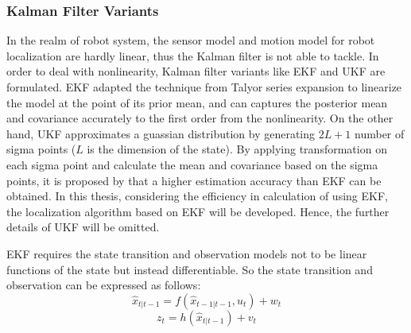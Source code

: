 \subsubsection{Kalman Filter Variants}
In the realm of robot system, the sensor model and motion model for robot localization are hardly linear, thus the Kalman filter is not able to tackle. In order to deal with nonlinearity, Kalman filter variants like \gls{EKF} and \gls{UKF} are formulated. \gls{EKF} adapted the technique from Talyor series expansion to linearize the model at the point of its prior mean, and can captures the posterior mean and covariance accurately to the first order from the nonlinearity. On the other hand, \gls{UKF} approximates a guassian distribution by generating $2L+1$ number of sigma points ($L$ is the dimension of the state). By applying transformation on each sigma point and calculate the mean and covariance based on the sigma points, it is proposed by \cite{Wan2000} that a higher estimation accuracy than \gls{EKF} can be obtained. In this thesis, considering the efficiency in calculation of using \gls{EKF}, the localization algorithm based on \gls{EKF} will be developed. Hence, the further details of \gls{UKF} will be omitted.

\gls{EKF} requires the state transition and observation models not to be linear functions of the state but instead differentiable. So the state transition and observation can be expressed as follows: 
\begin{equation}
\hat{x}_{t|t-1} = f(\hat{x}_{t-1|t-1}, u_{t}) + w_{t} 
  \label{eq:trans}
\end{equation}
\begin{equation}
z_{t} = h(\hat{x}_{t|t-1}) + v_{t}
  \label{eq:observ}
\end{equation}

